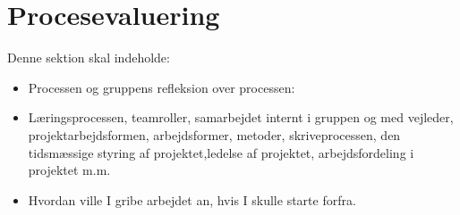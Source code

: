 \section{Procesevaluering}
Denne sektion skal indeholde:

\begin{itemize}
    \item Processen og gruppens refleksion over processen:
        \item Læringsprocessen, teamroller, samarbejdet internt i gruppen og med vejleder, projektarbejdsformen, arbejdsformer, metoder, skriveprocessen, den tidsmæssige styring af projektet,ledelse af projektet, arbejdsfordeling i projektet m.m.
        \item Hvordan ville I gribe arbejdet an, hvis I skulle starte forfra.
\end{itemize}{}